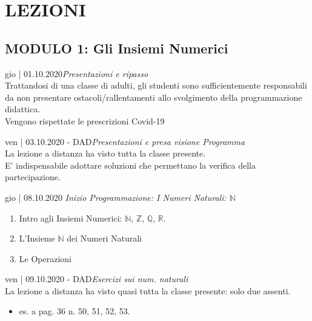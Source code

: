 \documentclass[10pt, a4paper twoside, notitlepage, notoc, justified]{tufte-handout}
\newcommand{\numberset}{\mathbb}
\newcommand{\N}{\numberset{N}}
\newcommand{\Z}{\numberset{Z}}
\newcommand{\Q}{\numberset{Q}}
\newcommand{\R}{\numberset{R}}
\begin{document}
\newpage
\section{\small \bf LEZIONI}
\subsection{\small \bf MODULO 1: Gli Insiemi Numerici}
\begin{loggentry}{gio | 01.10.2020}{\em Presentazioni e ripasso}\\
Trattandosi di una classe di adulti, gli studenti sono sufficientemente responsabili da non presentare ostacoli/rallentamenti allo svolgimento della programmazione didattica.\\Vengono rispettate le prescrizioni Covid-19
\end{loggentry}

\begin{loggentry}{ven | 03.10.2020 - DAD}{\em Presentazioni e presa visione Programma}\\
La lezione a distanza ha visto tutta la classe presente.\\
E' indispensabile adottare soluzioni che permettano la verifica della partecipazione.\\
\end{loggentry}

\begin{loggentry}{gio | 08.10.2020 }{\em Inizio Programmazione: I Numeri Naturali: $\N$}
\begin{enumerate}
	\item Intro agli Insiemi Numerici: $\N$, $\Z$, $\Q$, $\R$.
	\item L'Insieme $\N$ dei  Numeri Naturali
	\item Le Operazioni
\end{enumerate}
\end{loggentry}

\begin{loggentry}{ven | 09.10.2020 - DAD}{\em Esercizi sui num. naturali}\\
La lezione a distanza ha visto quasi tutta la classe presente: solo due assenti.
\begin{itemize}
	\item es. a pag. 36 n. 50, 51, 52, 53.
\end{itemize}
\end{loggentry}
\end{document}
